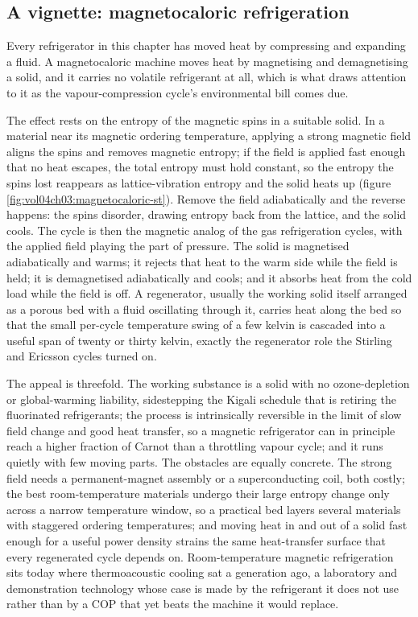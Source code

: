 

\subsection{A vignette: magnetocaloric refrigeration}

Every refrigerator in this chapter has moved heat by compressing and expanding a
fluid. A magnetocaloric machine moves heat by magnetising and demagnetising a
solid, and it carries no volatile refrigerant at all, which is what draws
attention to it as the vapour-compression cycle's environmental bill comes due.

The effect rests on the entropy of the magnetic spins in a suitable solid. In a
material near its magnetic ordering temperature, applying a strong magnetic field
aligns the spins and removes magnetic entropy; if the field is applied fast enough
that no heat escapes, the total entropy must hold constant, so the entropy the
spins lost reappears as lattice-vibration entropy and the solid heats up (figure
\ref{fig:vol04ch03:magnetocaloric-st}). Remove the field adiabatically and the
reverse happens: the spins disorder, drawing entropy back from the lattice, and
the solid cools. The cycle is then the magnetic analog of the gas refrigeration
cycles, with the applied field playing the part of pressure. The solid is
magnetised adiabatically and warms; it rejects that heat to the warm side while
the field is held; it is demagnetised adiabatically and cools; and it absorbs heat
from the cold load while the field is off. A regenerator, usually the working
solid itself arranged as a porous bed with a fluid oscillating through it, carries
heat along the bed so that the small per-cycle temperature swing of a few kelvin
is cascaded into a useful span of twenty or thirty kelvin, exactly the
regenerator role the Stirling and Ericsson cycles turned on.

The appeal is threefold. The working substance is a solid with no ozone-depletion
or global-warming liability, sidestepping the Kigali schedule that is retiring the
fluorinated refrigerants; the process is intrinsically reversible in the limit of
slow field change and good heat transfer, so a magnetic refrigerator can in
principle reach a higher fraction of Carnot than a throttling vapour cycle; and it
runs quietly with few moving parts. The obstacles are equally concrete. The
strong field needs a permanent-magnet assembly or a superconducting coil, both
costly; the best room-temperature materials undergo their large entropy change
only across a narrow temperature window, so a practical bed layers several
materials with staggered ordering temperatures; and moving heat in and out of a
solid fast enough for a useful power density strains the same heat-transfer surface
that every regenerated cycle depends on. Room-temperature magnetic refrigeration
sits today where thermoacoustic cooling sat a generation ago, a laboratory and
demonstration technology whose case is made by the refrigerant it does not use
rather than by a COP that yet beats the machine it would replace.

